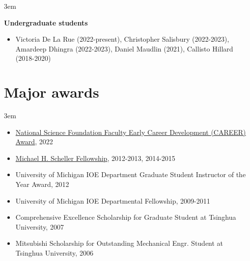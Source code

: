 \documentclass[11pt]{article}
\newenvironment{main}
{\begin{adjustwidth}{3em}{}}
{\end{adjustwidth}}
\begin{document}
\begin{main}
\begin{itemize}
\end{itemize}


\textbf{Undergraduate students}
\begin{itemize}
    \item
    Victoria De La Rue (2022-present),
    Christopher Salisbury (2022-2023), 
    Amardeep Dhingra (2022-2023), 
    Daniel Maudlin (2021), 
    Callisto Hillard (2018-2020)
\end{itemize}


\end{main}
\section*{Major awards}
\begin{main}

\begin{itemize}
    \item \href{https://www.nsf.gov/awardsearch/showAward?AWD_ID=2142757}{National Science Foundation Faculty Early Career Development (CAREER) Award}, 2022
    \item \href{https://scholarships.engin.umich.edu/featured/michael-h-scheller-fund/}{Michael H. Scheller Fellowship}, 2012-2013, 2014-2015
    \item University of Michigan IOE Department Graduate Student Instructor of the Year Award, 2012
    \item University of Michigan IOE Departmental Fellowship, 2009-2011
    \item Comprehensive Excellence Scholarship for Graduate Student at Tsinghua University, 2007
    \item Mitsubishi Scholarship for Outstanding Mechanical Engr. Student at Tsinghua University, 2006
\end{itemize}


\end{main}
\end{document}

